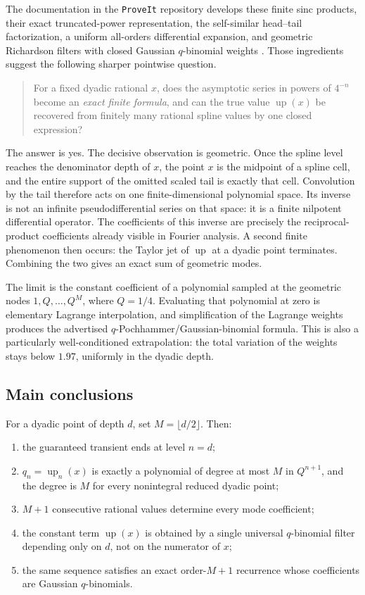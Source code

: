 \documentclass[11pt]{article}
\newcommand{\upf}{\operatorname{up}}
\begin{document}
The documentation in the \texttt{ProveIt} repository develops these finite
sinc products, their exact truncated-power representation, the self-similar
head--tail factorization, a uniform all-orders differential expansion, and
geometric Richardson filters with closed Gaussian \(q\)-binomial weights
\cite{ReshetnikovRepo}.  Those ingredients suggest the following sharper
pointwise question.

\begin{quote}
For a fixed dyadic rational \(x\), does the asymptotic series in powers of
\(4^{-n}\) become an \emph{exact finite formula}, and can the true value
\(\upf(x)\) be recovered from finitely many rational spline values by one
closed expression?
\end{quote}

The answer is yes.  The decisive observation is geometric.  Once the spline
level reaches the denominator depth of \(x\), the point \(x\) is the midpoint
of a spline cell, and the entire support of the omitted scaled tail is exactly
that cell.  Convolution by the tail therefore acts on one finite-dimensional
polynomial space.  Its inverse is not an infinite pseudodifferential series on
that space: it is a finite nilpotent differential operator.  The coefficients
of this inverse are precisely the reciprocal-product coefficients already
visible in Fourier analysis.  A second finite phenomenon then occurs: the
Taylor jet of \(\upf\) at a dyadic point terminates.  Combining the two gives
an exact sum of geometric modes.

The limit is the constant coefficient of a polynomial sampled at the geometric
nodes \(1,Q,\ldots,Q^M\), where \(Q=1/4\).  Evaluating that polynomial at zero
is elementary Lagrange interpolation, and simplification of the Lagrange
weights produces the advertised \(q\)-Pochhammer/Gaussian-binomial formula.
This is also a particularly well-conditioned extrapolation: the total
variation of the weights stays below \(1.97\), uniformly in the dyadic depth.

\subsection*{Main conclusions}

For a dyadic point of depth \(d\), set \(M=\lfloor d/2\rfloor\).  Then:
\begin{enumerate}[leftmargin=2.2em]
\item the guaranteed transient ends at level \(n=d\);
\item \(q_n=\upf_n(x)\) is exactly a polynomial of degree at most \(M\) in
      \(Q^{n+1}\), and the degree is \(M\) for every nonintegral reduced
      dyadic point;
\item \(M+1\) consecutive rational values determine every mode coefficient;
\item the constant term \(\upf(x)\) is obtained by a single universal
      \(q\)-binomial filter depending only on \(d\), not on the numerator of
      \(x\);
\item the same sequence satisfies an exact order-\(M+1\) recurrence whose
      coefficients are Gaussian \(q\)-binomials.
\end{enumerate}
\end{document}
